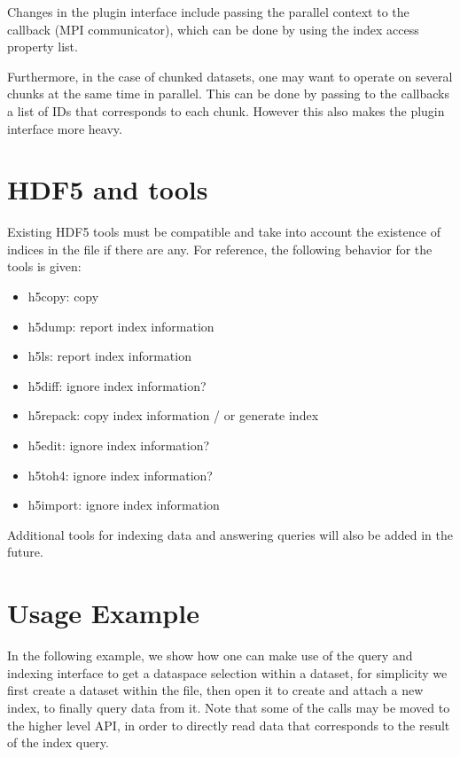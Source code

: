 \documentclass[letterpaper,hyper]{THG_RFC}
\begin{document}
Changes in the plugin interface include passing the parallel context to the
callback (MPI communicator), which can be done by using the index access property
list.

Furthermore, in the case of chunked datasets, one may want to operate on several chunks
at the same time in parallel. This can be done by passing to the callbacks a list of IDs that
corresponds to each chunk. However this also makes the plugin interface more
heavy.

\section{HDF5 and tools}

Existing HDF5 tools must be compatible and take into account the existence of
indices in the file if there are any. For reference, the following behavior for
the tools is given:

\begin{itemize}
\item h5copy: copy
\item h5dump: report index information
\item h5ls: report index information
\item h5diff: ignore index information?
\item h5repack: copy index information / or generate index
\item h5edit: ignore index information?
\item h5toh4: ignore index information?
\item h5import: ignore index information
\end{itemize}

Additional tools for indexing data and answering queries will also be added
in the future.

\section{Usage Example}

In the following example, we show how one can make use of the query and
indexing interface to get a dataspace selection within a dataset,
for simplicity we first create a dataset within the file, then open it to
create and attach a new index, to finally query data from it.
Note that some of the calls may be moved to the higher level API, in order to
directly read data that corresponds to the result of the index query.
\end{document}
